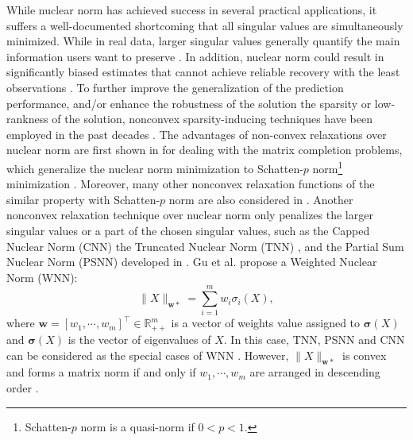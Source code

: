 \documentclass[twoside,11pt]{article}
\numberwithin{equation}{section}
\begin{document}
While nuclear norm has achieved success in several practical applications, it  suffers a well-documented shortcoming that all singular values are simultaneously minimized. While in real data, larger singular values   generally quantify the main information users want to preserve  \cite{review_LRR_2021}. 
In addition, nuclear norm could result in significantly biased estimates that cannot achieve reliable recovery with the least observations  \cite{Intro_wen2018_survey}.  To further improve the generalization of the prediction performance, and/or enhance the robustness of the solution the sparsity or low-rankness of the solution, nonconvex sparsity-inducing techniques have been employed in the past decades \cite{NonNon_AdaIRWM_zhang_wang_2021}. 
The advantages of non-convex relaxations over nuclear norm are first shown in  \cite{LRM_Rex2_Non_IRWA_2012,LRMR_Sp_2012} for dealing with the matrix completion problems, which generalize the nuclear norm minimization  to Schatten-$p$ norm\footnote{Schatten-$p$ norm is a quasi-norm if $0<p<1$.}  minimization \cite{review_LRR_2021}. 
Moreover, many other nonconvex relaxation functions of  the similar property with Schatten-$p$ norm  are also considered in \cite{ge_nn_LRMM_Canyi_2014,opt_simu_svd_2017}.
Another nonconvex relaxation technique over nuclear norm only penalizes  the larger singular values or a part of the chosen singular values, such as  the Capped Nuclear Norm (CNN) 
\cite{Relax_NCVX_CNN_RPCA_2013} 
the Truncated Nuclear Norm (TNN) 
\cite{Relax_NCVX_MC_via_TNN_2012,Relax_NCVX_MC_via_TNNSame2_2012}, 
and the Partial Sum Nuclear Norm (PSNN)  developed in \cite{PSNN_2013}.
Gu et al. \cite{NonCvx_RNNM_2014} propose a Weighted Nuclear Norm (WNN):
\begin{equation}
  \|X\|_{\mathbf{w}*} = \sum_{i=1}^{m} w_{i}\sigma_{i}(X),
\end{equation}
where $\mathbf{w} = [w_{1},\cdots,w_{m}]^{\top} \in \mathbb{R}^m_{++}$ is a vector of weights value assigned to $\bm{\sigma}(X)$ and $\bm{\sigma}(X)$ is the vector of eigenvalues of $X$.   
In this case, TNN, PSNN and CNN can be considered as the special cases of WNN \cite{review_LRR_2021}.
However,   $  \|X\|_{\mathbf{w}*}$  is convex and forms a matrix norm if and only if $w_{1}, \cdots, w_{m}$ are arranged in descending  order  \cite{opt_simu_svd_2017}.  
\end{document}
